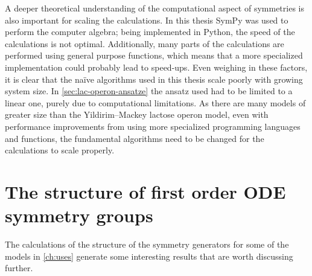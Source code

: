 A deeper theoretical understanding of the computational aspect of symmetries is also important for scaling the calculations.
In this thesis SymPy \cite{meurer2017sympy} was used to perform the computer algebra; being implemented in Python, the speed of the calculations is not optimal.
Additionally, many parts of the calculations are performed using general purpose functions, which means that a more specialized implementation could probably lead to speed-ups.
Even weighing in these factors, it is clear that the naïve algorithms used in this thesis scale poorly with growing system size.
In \cref{sec:lac-operon-ansatze} the ansatz used had to be limited to a linear one, purely due to computational limitations.
As there are many models of greater size than the Yildirim--Mackey lactose operon model, even with performance improvements from using more specialized programming languages and functions, the fundamental algorithms need to be changed for the calculations to scale properly.

\section{The structure of first order ODE symmetry groups}

The calculations of the structure of the symmetry generators for some of the models in \cref{ch:uses} generate some interesting results that are worth discussing further.

